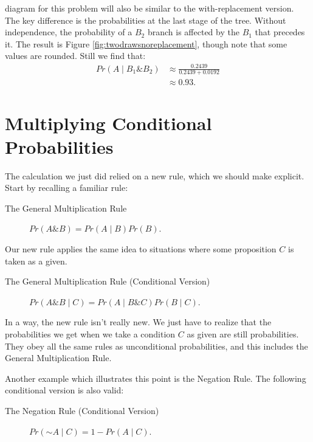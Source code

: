 \documentclass[justified]{tufte-book}
\newcommand{\given}{\mid}
\renewcommand{\neg}{\mathbin{\sim}}
\renewcommand{\wedge}{\mathbin{\&}}
\newcommand{\p}{Pr}
\theoremstyle{definition}
\theoremstyle{definition}
\theoremstyle{definition}
\theoremstyle{definition}
\theoremstyle{remark}
\begin{document}
 diagram for this problem will also be similar to the with-replacement version. The key difference is the probabilities at the last stage of the tree. Without independence, the probability of a \(B_2\) branch is affected by the \(B_1\) that precedes it. The result is Figure \ref{fig:twodrawsnoreplacement}, though note that some values are rounded. Still we find that:
\[
  \begin{aligned}
     \p(A \given B_1 \wedge B_2) &\approx \frac{ 0.2439 }{ 0.2439 + 0.0192 } \\
                                 &\approx 0.93.
  \end{aligned}
\]

\hypertarget{multiplying-conditional-probabilities}{%
\section{Multiplying Conditional Probabilities}\label{multiplying-conditional-probabilities}}

The calculation we just did relied on a new rule, which we should make explicit. Start by recalling a familiar rule:

\begin{description}
\item[The General Multiplication Rule]
\(\p(A \wedge B) = \p(A \given B) \p(B).\)
\end{description}

Our new rule applies the same idea to situations where some proposition \(C\) is taken as a given.

\begin{description}
\item[The General Multiplication Rule (Conditional Version)]
\(\p(A \wedge B \given C) = \p(A \given B \wedge C) \p(B \given C).\)
\end{description}

In a way, the new rule isn't really new. We just have to realize that the probabilities we get when we take a condition \(C\) as given are still probabilities. They obey all the same rules as unconditional probabilities, and this includes the General Multiplication Rule.

Another example which illustrates this point is the Negation Rule. The following conditional version is also valid:

\begin{description}
\item[The Negation Rule (Conditional Version)]
\(\p(\neg A \given C) = 1 - \p(A \given C).\)
\end{description}
\end{document}
